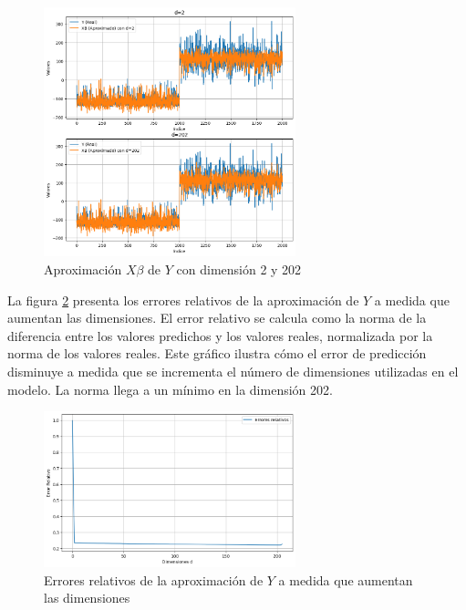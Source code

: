 \documentclass[12pt,a4]{article} %
\begin{document}
\begin{figure}[H]
    \centering
    \includegraphics[width=0.65\textwidth]{latex_project/plots1/worst _best.png}
    \caption{Aproximación $X\beta$ de $Y$ con dimensión 2 y 202}
    \label{fig:worst_best}
\end{figure}

La figura \ref{fig:Norm_relative_error} presenta los errores relativos de la aproximación de $Y$ a medida que aumentan las dimensiones. El error relativo se calcula como la norma de la diferencia entre los valores predichos y los valores reales, normalizada por la norma de los valores reales. Este gráfico ilustra cómo el error de predicción disminuye a medida que se incrementa el número de dimensiones utilizadas en el modelo. La norma llega a un mínimo en la dimensión 202.

\begin{figure}[H]
    \centering
    \includegraphics[width=0.65\textwidth]{latex_project/plots1/ERRORS_dimensiones.png}
    \caption{Errores relativos de la aproximación de $Y$ a medida que aumentan las dimensiones}
    \label{fig:Norm_relative_error}
\end{figure}
\end{document}
